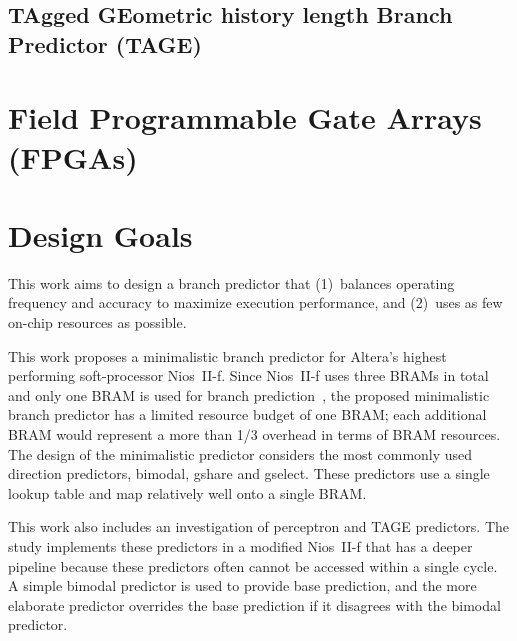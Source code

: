 \subsection{TAgged GEometric history length Branch Predictor (TAGE)}
\label{sec:background:dirpred:tage}


\section{Field Programmable Gate Arrays (FPGAs)}
\label{sec:background:fpga}



\section{Design Goals}
\label{sec:background:goal}

This work aims to design a branch predictor that (1)~balances operating frequency and accuracy to maximize execution performance, and (2)~uses as few on-chip resources as possible.

This work proposes a minimalistic branch predictor for Altera's highest performing soft-processor Nios~II-f. Since Nios~II-f uses three BRAMs in total and only one BRAM is used for branch prediction~\cite{niosiif}, the proposed minimalistic branch predictor has a limited resource budget of one BRAM; each additional BRAM would represent a more than 1/3 overhead in terms of BRAM resources. The design of the minimalistic predictor considers the most commonly used direction predictors, bimodal, gshare and gselect. These predictors use a single lookup table and map relatively well onto a single BRAM.

This work also includes an investigation of perceptron and TAGE predictors. The study implements these predictors in a modified Nios~II-f that has a deeper pipeline because these predictors often cannot be accessed within a single cycle. A simple bimodal predictor is used to provide base prediction, and the more elaborate predictor overrides the base prediction if it disagrees with the bimodal predictor.


